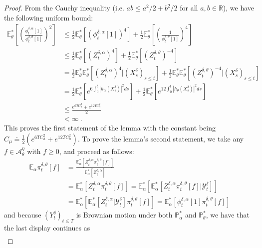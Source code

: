 \documentclass{article}
\begin{document}
\begin{proof} From the Cauchy inequality (i.e. $ab\leq a^{2}/2+b^{2}/2$ for all $a,b\in\mathbb R$), we have the following uniform bound:
\begin{align*}
\mathbb E_\theta^*\left[\left(\frac{\phi_t^{\delta,\alpha}[1]}{\phi_t^{\delta,\theta}[1]}\right)^2\right]&\leq \frac 12\mathbb E_\theta^*\left[\left(\phi_t^{\delta,\alpha}[1]\right)^4\right]+\frac 12\mathbb E_\theta^*\left[\left(\frac{1}{\phi_t^{\delta,\theta}[1]}\right)^4\right]\\
&\leq \frac 12\mathbb E_\theta^*\left[\left(Z_t^{\delta,\alpha}\right)^4\right]+\frac 12\mathbb E_\theta^*\left[\left(Z_t^{\delta,\theta}\right)^{-4}\right]\\
&= \frac 12\mathbb E_\theta^*\mathbb E_\theta^*\left[\left(Z_t^{\delta,\alpha}\right)^4\Big|(X_s^\delta)_{s\leq t}\right]+\frac 12\mathbb E_\theta^*\mathbb E_\theta^*\left[\left(Z_t^{\delta,\theta}\right)^{-4}\Big|(X_s^\delta)_{s\leq t}\right]\\
&= \frac 12\mathbb E_\theta^*\left[e^{6\int_0^t|h_\alpha(X_s^\delta)|^2ds}\right]+\frac{1}{2}\mathbb E_\theta^*\left[e^{12\int_0^t|h_\theta(X_s^\delta)|^2ds}\right]\\
&\leq \frac{e^{6TC_h^2}+e^{12 TC_h^2}}{2}\\
&<\infty\ .
\end{align*}
This proves the first statement of the lemma with the constant being $C_\mu \doteq\frac{1}{2}\left(e^{6TC_h^2}+e^{12TC_h^2}\right)$. To prove the lemma's second statement, we take any $f\in \mathcal A_\theta^\eta$  with $f\geq 0$, and proceed as follows:
\begin{align*}
\mathbb E_\alpha\pi_t^{\delta,\theta}[f]
&=\frac{\mathbb E_\alpha^*\left[Z_t^{\delta,\alpha}\pi_t^{\delta,\theta}[f]\right]}{\mathbb E_\alpha^*\left[Z_t^{\delta,\alpha}\right]}\\
&=\mathbb E_\alpha^*\left[Z_t^{\delta,\alpha}\pi_t^{\delta,\theta}[f]\right]=\mathbb E_\alpha^*\left[\mathbb E_\alpha^*\left[Z_t^{\delta,\alpha}\pi_t^{\delta,\theta}[f]\Big|\mathcal Y_t^\delta\right]\right]\\
&=\mathbb E_\alpha^*\left[\mathbb E_\alpha^*\left[Z_t^{\delta,\alpha}\Big|\mathcal Y_t^\delta\right]\pi_t^{\delta,\theta}[f]\right]=\mathbb E_\alpha^*\left[\phi_t^{\delta,\alpha}[1]\pi_t^{\delta,\theta}[f]\right]
\end{align*}
and because $(Y_t^\delta)_{t\leq T}$ is  Brownian motion under both $\mathbb P_\alpha^*$ and $\mathbb P_\theta^*$, we have that the last display continues as
\begin{align*}

\end{align*}
\end{proof}
\end{document}
